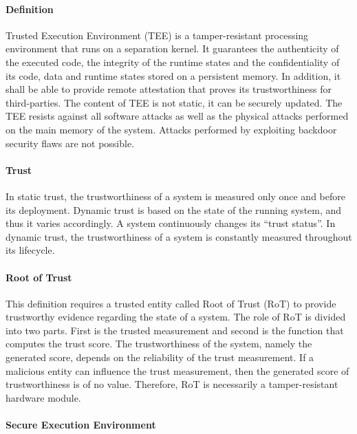 \documentclass{article}
\begin{document}
\paragraph{Definition}

Trusted Execution Environment (TEE) is a tamper-resistant processing environment that runs on a separation kernel. It guarantees the authenticity of the executed code, the integrity of the runtime states and the confidentiality of its code, data and runtime states stored on a persistent memory. In addition, it shall be able to provide remote attestation that proves its trustworthiness for third-parties. The content of TEE is not static, it can be securely updated. The TEE resists against all software attacks as well as the physical attacks performed on the main memory of the system. Attacks performed by exploiting backdoor security flaws are not possible.

\paragraph{Trust}

In static trust, the trustworthiness of a system is measured only once and before its deployment. Dynamic trust is based on the state of the running system, and thus it varies accordingly. A system continuously changes its “trust status”. In dynamic trust, the trustworthiness of a system is constantly measured throughout its lifecycle.

\paragraph{Root of Trust}

This definition requires a trusted entity called Root of Trust (RoT) to provide trustworthy evidence regarding the state of a system. The role of RoT is divided into two parts. First is the trusted measurement and second is the function that computes the trust score. The trustworthiness of the system, namely the generated score, depends on the reliability of the trust measurement. If a malicious entity can influence the trust measurement, then the generated score of trustworthiness is of no value. Therefore, RoT is necessarily a tamper-resistant hardware module.

\paragraph{Secure Execution Environment}
\end{document}
